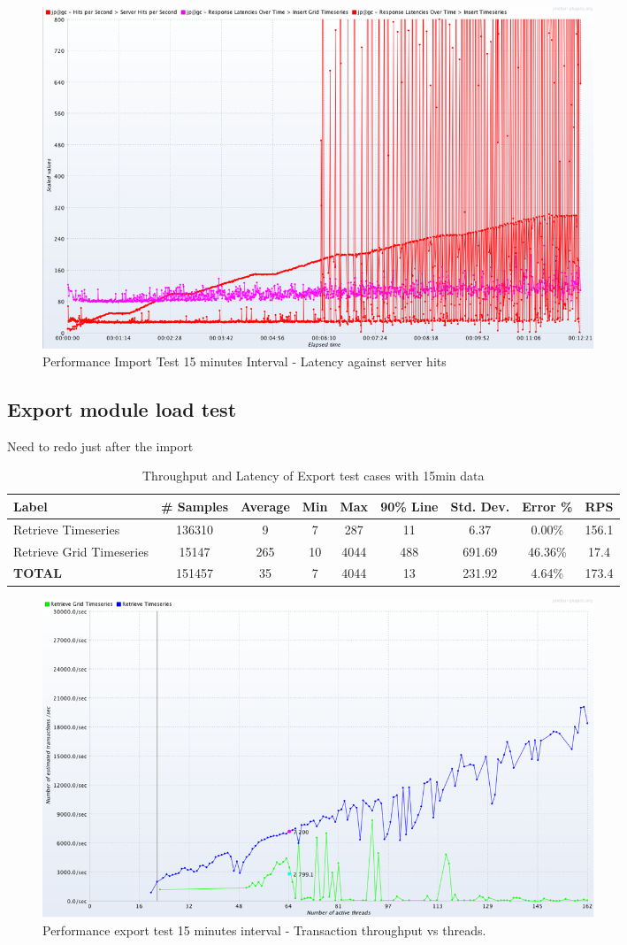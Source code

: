 \begin{figure}[htp]
    \centering
    \includegraphics[width=0.8\textwidth]{results/obs/import/obs_import_15m_res_latencies_against_hits.png}
    \caption{Performance Import Test 15 minutes Interval - Latency against server hits}
    \label{fi:test_obs_import_15m_latency}
\end{figure}



\subsection{Export module load test}
\label{subse:obs_test_plan_export_15min}
Need to redo just after the import
\begin{table}[ht]
\caption{Throughput and Latency of Export test cases with 15min data}
\footnotesize
\begin{tabulary}{\linewidth}{|L|C|C|C|C|C|C|C|C|}
\hline
Label & \# Samples & Average & Min & Max & 90\% Line & Std. Dev. & Error \% & RPS \\ \hline
Retrieve Timeseries & 136310 & 9 & 7 & 287 & 11 & 6.37 & 0.00\% & 156.1 \\ \hline
Retrieve Grid Timeseries & 15147 & 265 & 10 & 4044 & 488 & 691.69 & 46.36\% & 17.4 \\ \hline
\textbf{TOTAL} & 151457 & 35 & 7 & 4044 & 13 & 231.92 & 4.64\% & 173.4 \\ \hline
\end{tabulary}
\label{tab:obs_export_15_min_summary}
\end{table}

\begin{figure}[htp]
    \centering
    \includegraphics[width=0.8\textwidth]{results/obs/export/obs_export_15m_transaction_throughtput_vs_threads.png}
    \caption{Performance export test 15 minutes interval - Transaction throughput vs threads.}
    \label{fi:test_obs_export_15m_throughtput}
\end{figure}

